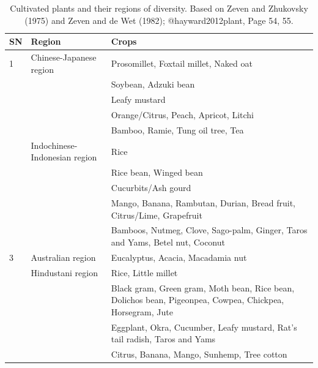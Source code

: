 \documentclass[ignorenonframetext,aspectratio=169]{beamer}
\begin{document}
\begin{frame}{}
\protect\hypertarget{section-11}{}

\begin{table}[t]

\caption{\label{tab:diversity-region1}Cultivated plants and their regions of diversity. Based on Zeven and Zhukovsky (1975) and Zeven and de Wet (1982); @hayward2012plant, Page 54, 55.}
\centering
\fontsize{6}{8}\selectfont
\begin{tabular}{>{\raggedright\arraybackslash}p{3em}>{\raggedright\arraybackslash}p{14em}>{\raggedright\arraybackslash}p{32em}}
\toprule
SN & Region & Crops\\
\midrule
\rowcolor{gray!6}  1 & Chinese-Japanese region & Prosomillet, Foxtail millet, Naked oat\\
 &  & Soybean, Adzuki bean\\
\rowcolor{gray!6}   &  & Leafy mustard\\
 &  & Orange/Citrus, Peach, Apricot, Litchi\\
\rowcolor{gray!6}   &  & Bamboo, Ramie, Tung oil tree, Tea\\
\addlinespace
2 & Indochinese-Indonesian region & Rice\\
\rowcolor{gray!6}   &  & Rice bean, Winged bean\\
 &  & Cucurbits/Ash gourd\\
\rowcolor{gray!6}   &  & Mango, Banana, Rambutan, Durian, Bread fruit, Citrus/Lime, Grapefruit\\
 &  & Bamboos, Nutmeg, Clove, Sago-palm, Ginger, Taros and Yams, Betel nut, Coconut\\
\addlinespace
\rowcolor{gray!6}  3 & Australian region & Eucalyptus, Acacia, Macadamia nut\\
4 & Hindustani region & Rice, Little millet\\
\rowcolor{gray!6}   &  & Black gram, Green gram, Moth bean, Rice bean, Dolichos bean, Pigeonpea, Cowpea, Chickpea, Horsegram, Jute\\
 &  & Eggplant, Okra, Cucumber, Leafy mustard, Rat's tail radish, Taros and Yams\\
\rowcolor{gray!6}   &  & Citrus, Banana, Mango, Sunhemp, Tree cotton\\
\bottomrule
\end{tabular}
\end{table}

\end{frame}
\end{document}

